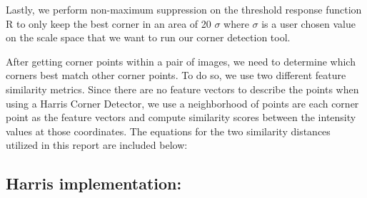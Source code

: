 \documentclass{article}
\begin{document}
Lastly, we perform non-maximum suppression on the threshold response function R to only keep the best corner in an area of 20 $\sigma$ where $\sigma$ is a user chosen value on the scale space that we want to run our corner detection tool.

After getting corner points within a pair of images, we need to determine which corners best match other corner points. To do so, we use two different feature similarity metrics. Since there are no feature vectors to describe the points when using a Harris Corner Detector, we use a neighborhood of points are each corner point as the feature vectors and compute similarity scores between the intensity values at those coordinates. The equations for the two similarity distances utilized in this report are included below:

\subsection{Harris implementation:}
\end{document}
